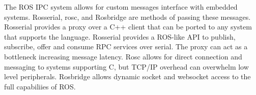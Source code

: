 The ROS IPC system allows for custom messages interface with embedded systems. Rosserial, rosc, and Rosbridge are methods of passing these messages. Rosserial provides a proxy over a C++ client that can be ported to any system that supports the language. Rosserial provides a ROS-like API to publish, subscribe, offer and consume RPC services over serial. The proxy can act as a bottleneck increasing message latency. Rosc allows for direct connection and messaging to systems supporting C, but TCP/IP overhead can overwhelm low level peripherals. Rosbridge allows dynamic socket and websocket access to the full capabiliies of ROS\cite{EMBEDDEDROS}.







